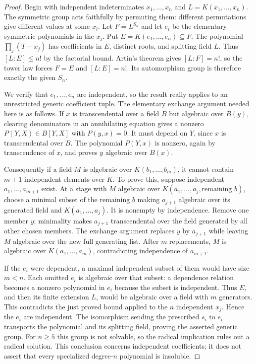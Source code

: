 \begin{proof}
Begin with independent indeterminates $x_1,\ldots,x_n$ and $L=K(x_1,\ldots,x_n)$. The symmetric group acts faithfully by permuting them: different permutations give different values at some $x_i$. Let $F=L^{S_n}$ and let $e_i$ be the elementary symmetric polynomials in the $x_j$. Put $E=K(e_1,\ldots,e_n)\subseteq F$. The polynomial $\prod_j(T-x_j)$ has coefficients in $E$, distinct roots, and splitting field $L$. Thus $[L:E]\leq n!$ by the factorial bound. Artin's theorem gives $[L:F]=n!$, so the tower law forces $F=E$ and $[L:E]=n!$. Its automorphism group is therefore exactly the given $S_n$.

We verify that $e_1,\ldots,e_n$ are independent, so the result really applies to an unrestricted generic coefficient tuple. The elementary exchange argument needed here is as follows. If $x$ is transcendental over a field $B$ but algebraic over $B(y)$, clearing denominators in an annihilating equation gives a nonzero $P(Y,X)\in B[Y,X]$ with $P(y,x)=0$. It must depend on $Y$, since $x$ is transcendental over $B$. The polynomial $P(Y,x)$ is nonzero, again by transcendence of $x$, and proves $y$ algebraic over $B(x)$.

Consequently if a field $M$ is algebraic over $K(b_1,\ldots,b_m)$, it cannot contain $m+1$ independent elements over $K$. To prove this, suppose independent $a_1,\ldots,a_{m+1}$ exist. At a stage with $M$ algebraic over $K(a_1,\ldots,a_j,\text{remaining }b)$, choose a minimal subset of the remaining $b$ making $a_{j+1}$ algebraic over its generated field and $K(a_1,\ldots,a_j)$. It is nonempty by independence. Remove one member $y$; minimality makes $a_{j+1}$ transcendental over the field generated by all other chosen members. The exchange argument replaces $y$ by $a_{j+1}$ while leaving $M$ algebraic over the new full generating list. After $m$ replacements, $M$ is algebraic over $K(a_1,\ldots,a_m)$, contradicting independence of $a_{m+1}$.

If the $e_i$ were dependent, a maximal independent subset of them would have size $m<n$. Each omitted $e_i$ is algebraic over that subset: a dependence relation becomes a nonzero polynomial in $e_i$ because the subset is independent. Thus $E$, and then its finite extension $L$, would be algebraic over a field with $m$ generators. This contradicts the just proved bound applied to the $n$ independent $x_j$. Hence the $e_i$ are independent. The isomorphism sending the prescribed $s_i$ to $e_i$ transports the polynomial and its splitting field, proving the asserted generic group. For $n\geq5$ this group is not solvable, so the radical implication rules out a radical solution. This conclusion concerns independent coefficients; it does not assert that every specialized degree-$n$ polynomial is insoluble.
\end{proof}

